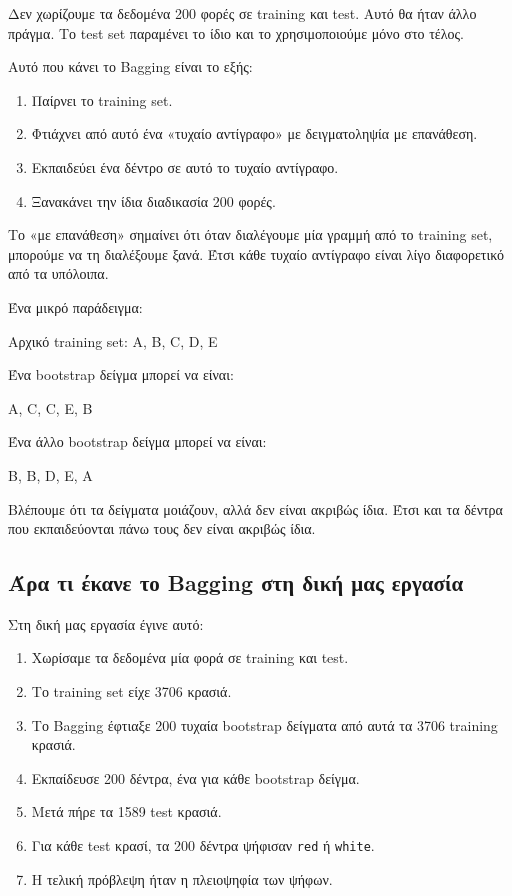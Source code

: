 \documentclass[12pt,a4paper]{article}
\newcommand{\code}[1]{\texttt{\textenglish{#1}}}
\begin{document}
Δεν χωρίζουμε τα δεδομένα 200 φορές σε training και test. Αυτό θα ήταν άλλο
πράγμα. Το test set παραμένει το ίδιο και το χρησιμοποιούμε μόνο στο τέλος.

Αυτό που κάνει το Bagging είναι το εξής:

\begin{enumerate}
    \item Παίρνει το training set.
    \item Φτιάχνει από αυτό ένα «τυχαίο αντίγραφο» με δειγματοληψία με
    επανάθεση.
    \item Εκπαιδεύει ένα δέντρο σε αυτό το τυχαίο αντίγραφο.
    \item Ξανακάνει την ίδια διαδικασία 200 φορές.
\end{enumerate}

Το «με επανάθεση» σημαίνει ότι όταν διαλέγουμε μία γραμμή από το training set,
μπορούμε να τη διαλέξουμε ξανά. Έτσι κάθε τυχαίο αντίγραφο είναι λίγο
διαφορετικό από τα υπόλοιπα.

Ένα μικρό παράδειγμα:

\begin{center}
Αρχικό training set: A, B, C, D, E
\end{center}

Ένα bootstrap δείγμα μπορεί να είναι:

\begin{center}
A, C, C, E, B
\end{center}

Ένα άλλο bootstrap δείγμα μπορεί να είναι:

\begin{center}
B, B, D, E, A
\end{center}

Βλέπουμε ότι τα δείγματα μοιάζουν, αλλά δεν είναι ακριβώς ίδια. Έτσι και τα
δέντρα που εκπαιδεύονται πάνω τους δεν είναι ακριβώς ίδια.

\subsection{Άρα τι έκανε το Bagging στη δική μας εργασία}

Στη δική μας εργασία έγινε αυτό:

\begin{enumerate}
    \item Χωρίσαμε τα δεδομένα μία φορά σε training και test.
    \item Το training set είχε 3706 κρασιά.
    \item Το Bagging έφτιαξε 200 τυχαία bootstrap δείγματα από αυτά τα 3706
    training κρασιά.
    \item Εκπαίδευσε 200 δέντρα, ένα για κάθε bootstrap δείγμα.
    \item Μετά πήρε τα 1589 test κρασιά.
    \item Για κάθε test κρασί, τα 200 δέντρα ψήφισαν \code{red} ή \code{white}.
    \item Η τελική πρόβλεψη ήταν η πλειοψηφία των ψήφων.
\end{enumerate}
\end{document}
